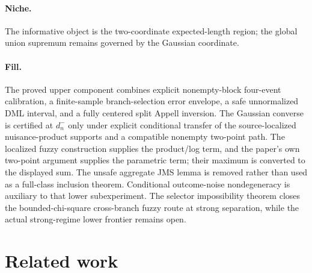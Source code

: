 \documentclass{article}
\begin{document}
\paragraph{Niche.} The informative object is the two-coordinate expected-length region; the global union supremum remains governed by the Gaussian coordinate.

\paragraph{Fill.} The proved upper component combines explicit nonempty-block four-event calibration, a finite-sample branch-selection error envelope, a safe unnormalized DML interval, and a fully centered split Appell inversion. The Gaussian converse is certified at \(d_n^-\) only under explicit conditional transfer of the source-localized nuisance-product supports and a compatible nonempty two-point path. The localized fuzzy construction supplies the product/log term, and the paper's own two-point argument supplies the parametric term; their maximum is converted to the displayed sum. The unsafe aggregate JMS lemma is removed rather than used as a full-class inclusion theorem. Conditional outcome-noise nondegeneracy is auxiliary to that lower subexperiment. The selector impossibility theorem closes the bounded-chi-square cross-branch fuzzy route at strong separation, while the actual strong-regime lower frontier remains open.

\section{Related work}
\end{document}
